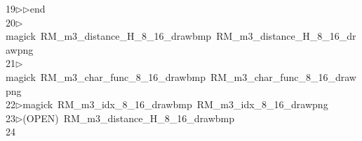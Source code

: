 \begin{tabbing}
19\>$\triangleright$\>$\triangleright$\>end\\[0pt]
20\>$\triangleright$\>magick\ RM\_m3\_distance\_H\_8\_16\_drawbmp\ RM\_m3\_distance\_H\_8\_16\_drawpng\\[0pt]
21\>$\triangleright$\>magick\ RM\_m3\_char\_func\_8\_16\_drawbmp\ RM\_m3\_char\_func\_8\_16\_drawpng\\[0pt]
22\>$\triangleright$\>magick\ RM\_m3\_idx\_8\_16\_drawbmp\ RM\_m3\_idx\_8\_16\_drawpng\\[0pt]
23\>$\triangleright$\>(OPEN)\ RM\_m3\_distance\_H\_8\_16\_drawbmp\\[0pt]
24\>\end{tabbing}
